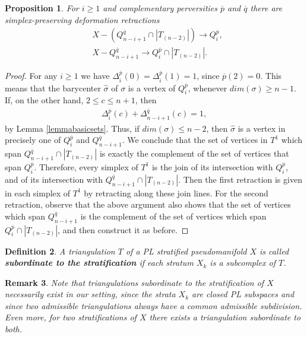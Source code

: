 \documentclass{scrreprt}
\newtheorem{prop}{Proposition}[chapter]
\newtheorem{definition}[prop]{Definition}
\newtheorem{remark}[prop]{Remark}
\begin{document}
\begin{prop}\label{retractions}
For $i \geq 1$ and complementary perversities $\overline{p}$ and $\overline{q}$ there are simplex-preserving deformation retractions
\begin{align*}
&X-(Q_{n-i+1}^{\overline{q}} \cap |T_{(n-2)}|) \to Q_i^{\overline{p}} , \\
&X- Q_{n-i+1}^{\overline{q}} \to Q_i^{\overline{p}} \cap |T_{(n-2)}|.
\end{align*}
\end{prop}

\begin{proof}
For any $i \geq 1$ we have $\Delta_i^{\overline{p}}(0)=\Delta_i^{\overline{p}}(1)=1$, since $\overline{p}(2)=0$. This means that the barycenter $\hat{\sigma}$ of $\sigma$ is a vertex of $Q_i^{\overline{p}}$, whenever $dim(\sigma) \geq n-1$. If, on the other hand, $2 \leq c \leq n+1$, then
\begin{align*}
\Delta_i^{\overline{p}}(c)+ \Delta_{n-i+1}^{\overline{q}}(c)=1,
\end{align*}
by Lemma \ref{lemmabasicsets}. Thus, if $dim(\sigma) \leq n-2$, then $\hat{\sigma}$ is a vertex in precisely one of $Q_i^{\overline{p}}$ and $Q_{n-i+1}^{\overline{q}}$. We conclude that the set of vertices in $T^1$ which span $Q_{n-i+1}^{\overline{q}} \cap |T_{(n-2)}|$ is exactly the complement of the set of vertices that span $Q_i^{\overline{p}}$. Therefore, every simplex of $T^1$ is the join of its intersection with $Q_i^{\overline{p}}$, and of its intersection with $Q_{n-i+1}^{\overline{q}} \cap |T_{(n-2)}|$. Then the first retraction is given in each simplex of $T^1$ by retracting along these join lines. For the second retraction, observe that the above argument also shows that the set of vertices which span $Q_{n-i+1}^{\overline{q}}$ is the complement of the set of vertices which span $Q_i^{\overline{p}} \cap |T_{(n-2)}|$, and then construct it as before.
\end{proof}

\begin{definition}
A triangulation $T$ of a PL stratified pseudomanifold $X$ is called \textbf{subordinate to the stratification} if each stratum $X_k$ is a subcomplex of $T$.
\end{definition}

\begin{remark}
Note that triangulations subordinate to the stratification of $X$ necessarily exist in our setting, since the strata $X_k$ are closed PL subspaces and since two admissible triangulations always have a common admissible subdivision. Even more, for two stratifications of $X$ there exists a triangulation subordinate to both.
\end{remark}
\end{document}
